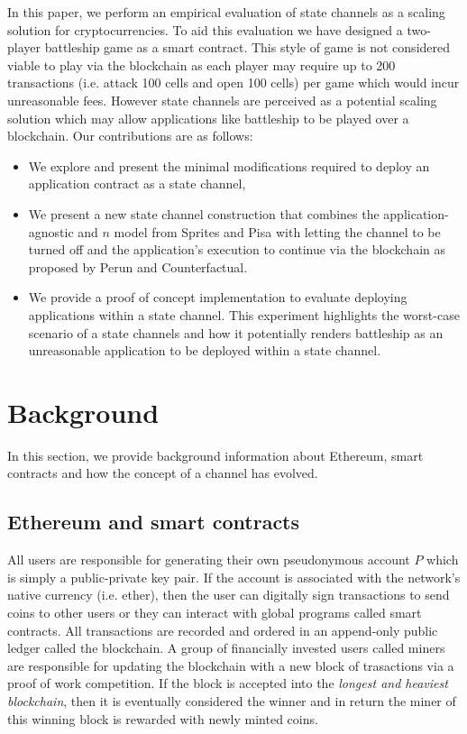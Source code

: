 \documentclass{llncs}
\begin{document}
In this paper, we perform an empirical evaluation of state channels as a scaling solution for cryptocurrencies. 
To aid this evaluation we have designed a two-player battleship game as a smart contract.
This style of game is not considered viable to play via the blockchain as each player may require up to 200 transactions (i.e. attack 100 cells and open 100 cells) per game which would incur unreasonable fees.
However state channels are perceived as a potential scaling solution which may allow applications like battleship to be played over a blockchain.  
Our contributions are as follows: 

\begin{itemize}
\item We explore and present the minimal modifications required to deploy an application contract as a state channel, 
\item We present a new state channel construction that combines the application-agnostic and $n$ model from Sprites and Pisa with letting the channel to be turned off and the application's execution to continue via the blockchain as proposed by Perun and Counterfactual. 
\item We provide a proof of concept implementation to evaluate deploying applications within a state channel.
This experiment highlights the worst-case scenario of a state channels and how it potentially renders battleship as an unreasonable application to be deployed within a state channel. 
\end{itemize}

\section{Background}

In this section, we provide background information about Ethereum, smart contracts and how the concept of a channel has evolved. 

\subsection{Ethereum and smart contracts}

All users are responsible for generating their own pseudonymous account $P$ which is simply a public-private key pair. 
If the account is associated with the network's native currency (i.e. ether), then the user can digitally sign transactions to send coins to other users or they can interact with global programs called smart contracts. 
All transactions are recorded and ordered in an append-only public ledger called the blockchain.
A group of financially invested users called miners are responsible for updating the blockchain with a new block of trasactions via a proof of work competition. 
If the block is accepted into the \textit{longest and heaviest blockchain}, then it is eventually considered the winner and in return the miner of this winning block is rewarded with newly minted coins. 
\end{document}
